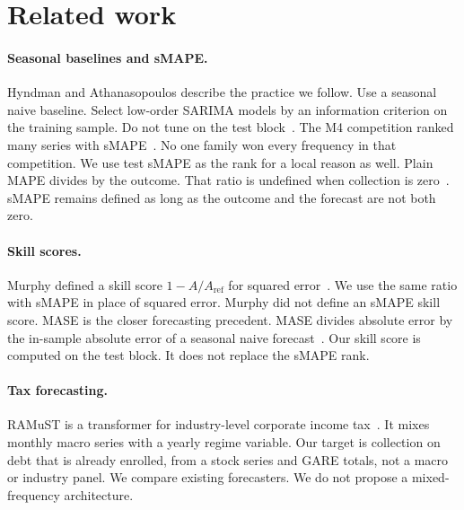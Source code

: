 \section{Related work}
\label{sec:related}

\paragraph{Seasonal baselines and sMAPE.}
Hyndman and Athanasopoulos describe the practice we follow.
Use a seasonal naive baseline.
Select low-order SARIMA models by an information criterion on the training sample.
Do not tune on the test block~\citep{hyndman2021fpp3,box1970tsa}.
The M4 competition ranked many series with sMAPE~\citep{makridakis2020m4}.
No one family won every frequency in that competition.
We use test sMAPE as the rank for a local reason as well.
Plain MAPE divides by the outcome.
That ratio is undefined when collection is zero~\citep{hyndman2006measures}.
sMAPE remains defined as long as the outcome and the forecast are not both zero.

\paragraph{Skill scores.}
Murphy defined a skill score $1 - A/A_{\mathrm{ref}}$ for squared error~\citep{murphy1988skill}.
We use the same ratio with sMAPE in place of squared error.
Murphy did not define an sMAPE skill score.
MASE is the closer forecasting precedent.
MASE divides absolute error by the in-sample absolute error of a seasonal naive forecast~\citep{hyndman2006measures}.
Our skill score is computed on the test block.
It does not replace the sMAPE rank.

\paragraph{Tax forecasting.}
RAMuST is a transformer for industry-level corporate income tax~\citep{you2025ramust}.
It mixes monthly macro series with a yearly regime variable.
Our target is collection on debt that is already enrolled, from a stock series and GARE totals, not a macro or industry panel.
We compare existing forecasters.
We do not propose a mixed-frequency architecture.

